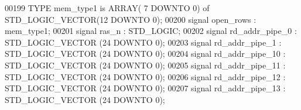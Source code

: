 \begin{DoxyCode}
00199                 \textcolor{keywordflow}{TYPE} \textcolor{vhdlchar}{mem_type1} \textcolor{keywordflow}{is} \textcolor{keywordflow}{ARRAY}\textcolor{vhdlchar}{(} \textcolor{vhdllogic}{}\textcolor{vhdllogic}{7} \textcolor{keywordflow}{DOWNTO} \textcolor{vhdllogic}{}\textcolor{vhdllogic}{0}\textcolor{vhdlchar}{)} \textcolor{keywordflow}{of} \textcolor{comment}{STD\_LOGIC\_VECTOR}\textcolor{vhdlchar}{(}\textcolor{vhdllogic}{}\textcolor{vhdllogic}{12} \textcolor{keywordflow}{DOWNTO} \textcolor{vhdllogic}{}\textcolor{vhdllogic}{0}\textcolor{vhdlchar}{)};
00200               \textcolor{keywordflow}{signal} \textcolor{vhdlchar}{open_rows} \textcolor{vhdlchar}{:} \textcolor{vhdlchar}{mem_type1};
00201                 \textcolor{keywordflow}{signal} \textcolor{vhdlchar}{ras_n} \textcolor{vhdlchar}{:}  \textcolor{comment}{STD\_LOGIC};
00202                 \textcolor{keywordflow}{signal} \textcolor{vhdlchar}{rd_addr_pipe_0} \textcolor{vhdlchar}{:}  \textcolor{comment}{STD\_LOGIC\_VECTOR} \textcolor{vhdlchar}{(}\textcolor{vhdllogic}{}\textcolor{vhdllogic}{24} \textcolor{keywordflow}{DOWNTO} \textcolor{vhdllogic}{}\textcolor{vhdllogic}{0}\textcolor{vhdlchar}{)};
00203                 \textcolor{keywordflow}{signal} \textcolor{vhdlchar}{rd_addr_pipe_1} \textcolor{vhdlchar}{:}  \textcolor{comment}{STD\_LOGIC\_VECTOR} \textcolor{vhdlchar}{(}\textcolor{vhdllogic}{}\textcolor{vhdllogic}{24} \textcolor{keywordflow}{DOWNTO} \textcolor{vhdllogic}{}\textcolor{vhdllogic}{0}\textcolor{vhdlchar}{)};
00204                 \textcolor{keywordflow}{signal} \textcolor{vhdlchar}{rd_addr_pipe_10} \textcolor{vhdlchar}{:}  \textcolor{comment}{STD\_LOGIC\_VECTOR} \textcolor{vhdlchar}{(}\textcolor{vhdllogic}{}\textcolor{vhdllogic}{24} \textcolor{keywordflow}{DOWNTO} \textcolor{vhdllogic}{}\textcolor{vhdllogic}{0}\textcolor{vhdlchar}{)};
00205                 \textcolor{keywordflow}{signal} \textcolor{vhdlchar}{rd_addr_pipe_11} \textcolor{vhdlchar}{:}  \textcolor{comment}{STD\_LOGIC\_VECTOR} \textcolor{vhdlchar}{(}\textcolor{vhdllogic}{}\textcolor{vhdllogic}{24} \textcolor{keywordflow}{DOWNTO} \textcolor{vhdllogic}{}\textcolor{vhdllogic}{0}\textcolor{vhdlchar}{)};
00206                 \textcolor{keywordflow}{signal} \textcolor{vhdlchar}{rd_addr_pipe_12} \textcolor{vhdlchar}{:}  \textcolor{comment}{STD\_LOGIC\_VECTOR} \textcolor{vhdlchar}{(}\textcolor{vhdllogic}{}\textcolor{vhdllogic}{24} \textcolor{keywordflow}{DOWNTO} \textcolor{vhdllogic}{}\textcolor{vhdllogic}{0}\textcolor{vhdlchar}{)};
00207                 \textcolor{keywordflow}{signal} \textcolor{vhdlchar}{rd_addr_pipe_13} \textcolor{vhdlchar}{:}  \textcolor{comment}{STD\_LOGIC\_VECTOR} \textcolor{vhdlchar}{(}\textcolor{vhdllogic}{}\textcolor{vhdllogic}{24} \textcolor{keywordflow}{DOWNTO} \textcolor{vhdllogic}{}\textcolor{vhdllogic}{0}\textcolor{vhdlchar}{)};

\end{DoxyCode}
